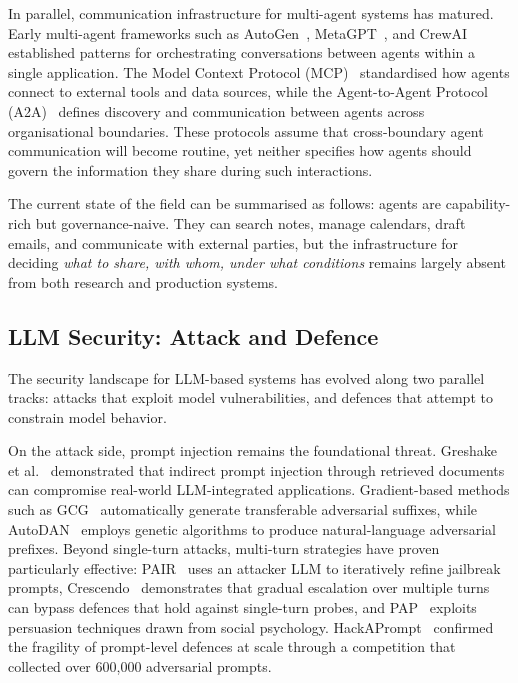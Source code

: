\documentclass{article}
\begin{document}
In parallel, communication infrastructure for multi-agent systems has matured. Early multi-agent frameworks such as AutoGen~\citep{wu2023autogen}, MetaGPT~\citep{hong2023metagpt}, and CrewAI~\citep{crewai2024} established patterns for orchestrating conversations between agents within a single application. The Model Context Protocol (MCP)~\citep{anthropic2024mcp} standardised how agents connect to external tools and data sources, while the Agent-to-Agent Protocol (A2A)~\citep{google2025a2a} defines discovery and communication between agents across organisational boundaries. These protocols assume that cross-boundary agent communication will become routine, yet neither specifies how agents should govern the information they share during such interactions.

The current state of the field can be summarised as follows: agents are capability-rich but governance-naive. They can search notes, manage calendars, draft emails, and communicate with external parties, but the infrastructure for deciding \emph{what to share, with whom, under what conditions} remains largely absent from both research and production systems.


\subsection{LLM Security: Attack and Defence}

The security landscape for LLM-based systems has evolved along two parallel tracks: attacks that exploit model vulnerabilities, and defences that attempt to constrain model behavior.

On the attack side, prompt injection remains the foundational threat. Greshake et al.~\citep{greshake2023not} demonstrated that indirect prompt injection through retrieved documents can compromise real-world LLM-integrated applications. Gradient-based methods such as GCG~\citep{zou2023universal} automatically generate transferable adversarial suffixes, while AutoDAN~\citep{liu2024autodan} employs genetic algorithms to produce natural-language adversarial prefixes. Beyond single-turn attacks, multi-turn strategies have proven particularly effective: PAIR~\citep{chao2025pair} uses an attacker LLM to iteratively refine jailbreak prompts, Crescendo~\citep{russinovich2025crescendo} demonstrates that gradual escalation over multiple turns can bypass defences that hold against single-turn probes, and PAP~\citep{zeng2024pap} exploits persuasion techniques drawn from social psychology. HackAPrompt~\citep{schulhoff2024hackaprompt} confirmed the fragility of prompt-level defences at scale through a competition that collected over 600,000 adversarial prompts.
\end{document}

